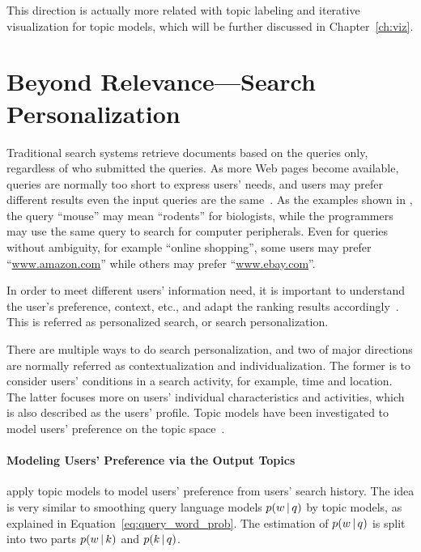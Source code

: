 This direction is actually more related with topic labeling and iterative visualization for topic models, which will be further discussed in Chapter~\ref{ch:viz}.

\section{Beyond Relevance---Search Personalization}

Traditional search systems retrieve documents based on the queries only, regardless of who submitted the queries.
As more Web pages become available, queries are normally too short to express users' needs, and
users may prefer different results even the input queries are the same~\citep{Jansen-2000,Dou-2007}.
As the examples shown in \citet{Dou-2007}, the query ``mouse'' may mean ``rodents'' for biologists, 
while the programmers may use the same query to search for computer peripherals. Even for queries without
ambiguity, for example ``online shopping'', some users may prefer ``\url{www.amazon.com}'' while others may
prefer ``\url{www.ebay.com}''.

In order to meet different users' information need, it is important to understand the user's preference, context,
etc., and adapt the ranking results accordingly~\citep{Pitkow-2002,Micarelli-2007}.
This is referred as personalized search, or search personalization.

There are multiple ways to do search personalization, and two of major directions are normally referred as contextualization and individualization\citep{Pitkow-2002}. The former is to consider users' conditions in a search activity, for example, time and location.
The latter focuses more on users' individual characteristics and activities, which is also described as the users' profile.
Topic models have been investigated to model users' preference on the topic space~\citep{Song-2010,Carman-2010}.

\paragraph{Modeling Users' Preference via the Output Topics}

\citet{Song-2010} apply topic models to model users' preference from
users' search history. The idea is very similar to smoothing query
language models $p(w \, | \, q)$ by topic models, as explained in Equation~\ref{eq:query_word_prob}. The estimation of $p(w \, | \, q)$ is split into two parts $p(w \, | \, k)$ and $p(k \, | \, q)$.

